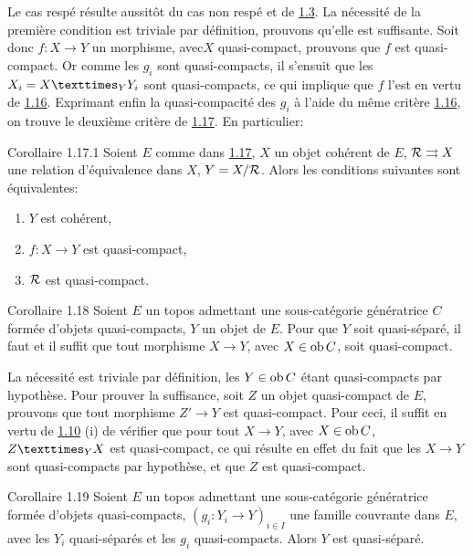 \documentclass[10pt]{../fichiers-configuration-latex/smfart}
\begin{document}
Le cas respé résulte aussitôt du cas non respé et de \hyperref[VI.prop1.3]{1.3}. La nécessité
de la première condition est triviale par définition, prouvons qu'elle
est suffisante. Soit donc $f : X \to Y$ un morphisme, avec\pageoriginale $X$
quasi-compact, prouvons que $f$ est quasi-compact. Or comme les $g_i$
sont quasi-compacts, il s'ensuit que les $X_i = \fprod{X}{Y_i}{Y}$
sont quasi-compacts, ce qui implique que $f$ l'est en vertu de
\hyperref[VI.cor1.16]{1.16}. Exprimant enfin la quasi-compacité des $g_i$ à l'aide du même
critère \hyperref[VI.cor1.16]{1.16}, on trouve le deuxième critère de \hyperref[VI.cor1.17]{1.17}. En particulier:

\begin{enonce*}{Corollaire 1.17.1}
Soient $E$ comme dans \hyperref[VI.cor1.17]{1.17}, $X$ un objet cohérent de
$E$, ${\mathcal R} \rightrightarrows X$ une relation d'équivalence dans $X$,
$Y = X / {\mathcal R}$. Alors les conditions suivantes sont équivalentes:
\begin{enumerate}
\renewcommand{\theenumi}{\roman{enumi}}
\renewcommand{\labelenumi}{(\theenumi)}
\item $Y$ est cohérent,
\item $f : X \to Y$ est quasi-compact,
\item ${\mathcal R}$ est quasi-compact.
\end{enumerate}
\end{enonce*}

\begin{enonce*}{Corollaire 1.18}
Soient $E$ un topos admettant une sous-catégorie génératrice $C$
formée d'objets quasi-compacts, $Y$ un objet de $E$. Pour que $Y$ soit
quasi-séparé, il faut et il suffit que tout morphisme $X \to Y$, avec
$X \in \operatorname{ob} C$, soit quasi-compact.
\end{enonce*}

La nécessité est triviale par définition, les $Y \in \operatorname{ob} C$ étant
quasi-compacts par hypothèse. Pour prouver la suffisance, soit $Z$
un objet quasi-compact de $E$, prouvons que tout morphisme $Z'\to Y$
est quasi-compact. Pour ceci, il suffit en vertu de
\hyperref[VI.prop1.10]{1.10} (i) de vérifier que pour tout $X \to Y$, avec $X
\in \operatorname{ob} C$, $\fprod{Z}{X}{Y}$ est quasi-compact, ce qui résulte en
effet du fait que les $X \to Y$ sont quasi-compacts par hypothèse,
et que $Z$ est quasi-compact.

\begin{enonce*}{Corollaire 1.19}
Soient \pageoriginale $E$ un topos admettant une sous-catégorie
génératrice formée d'objets quasi-compacts, $(g_i : Y_i \to Y)_{i \in
  I}$ une famille couvrante dans $E$, avec les $Y_i$ quasi-séparés et
les $g_i$ quasi-compacts. Alors $Y$ est quasi-séparé.
\end{enonce*}
\end{document}
